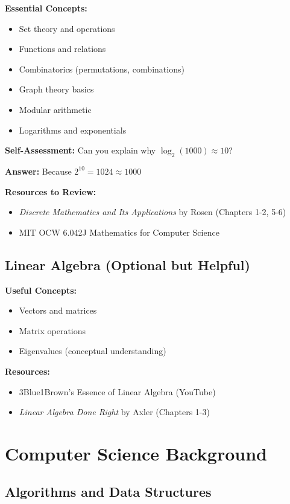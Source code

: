 \textbf{Essential Concepts:}
\begin{itemize}
\item Set theory and operations
\item Functions and relations
\item Combinatorics (permutations, combinations)
\item Graph theory basics
\item Modular arithmetic
\item Logarithms and exponentials
\end{itemize}

\textbf{Self-Assessment:}
Can you explain why $\log_2(1000) \approx 10$?

\textbf{Answer:} Because $2^{10} = 1024 \approx 1000$

\textbf{Resources to Review:}
\begin{itemize}
\item \textit{Discrete Mathematics and Its Applications} by Rosen (Chapters 1-2, 5-6)
\item MIT OCW 6.042J Mathematics for Computer Science
\end{itemize}

\subsection{Linear Algebra (Optional but Helpful)}

\textbf{Useful Concepts:}
\begin{itemize}
\item Vectors and matrices
\item Matrix operations
\item Eigenvalues (conceptual understanding)
\end{itemize}

\textbf{Resources:}
\begin{itemize}
\item 3Blue1Brown's Essence of Linear Algebra (YouTube)
\item \textit{Linear Algebra Done Right} by Axler (Chapters 1-3)
\end{itemize}

\section{Computer Science Background}

\subsection{Algorithms and Data Structures}

